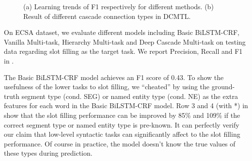 \begin{figure}[h]
	\centering
	\caption{(a) Learning trends of F1 respectively for different methods.
	(b) Result of different cascade connection types in DCMTL.}
	\label{fig:learning_curve}
\end{figure}

On ECSA dataset,
we evaluate different models including 
Basic BiLSTM-CRF, Vanilla Multi-task, 
Hierarchy Multi-task and Deep Cascade Multi-task
on testing data regarding slot filling as the target task. %
We report Precision, Recall and F1 in .

The Basic BiLSTM-CRF model achieves an F1 score of 0.43.
To show the usefulness of the lower tasks to slot filling,
we ``cheated'' by using the ground-truth segment type (cond. SEG) or 
named entity type (cond. NE) as the extra features for each word
in the Basic BiLSTM-CRF model.
Row 3 and 4 (with *) in  show that the slot filling 
performance can be improved by 85\% and 109\% if the correct segment type
or named entity type is pre-known.
It can perfectly verify our claim that low-level syntactic tasks can significantly affect to the slot filling performance.
Of course in practice, the model doesn't know the true values of these types during prediction.

